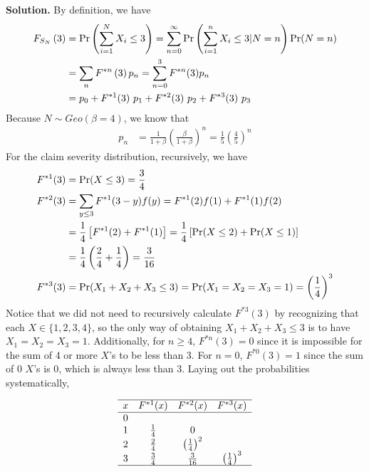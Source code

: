 \documentclass[]{book}
\theoremstyle{definition}
\theoremstyle{definition}
\theoremstyle{definition}
\theoremstyle{remark}
\begin{document}
\hypertarget{toggleExampleAggLoss.3.3}{}
\textbf{Solution.} By definition, we have \[\begin{aligned}
F_{S_N}\left(3 \right) &= {\rm Pr}\left(\sum_{i=1}^N X_i \leq 3\right) = \sum_{n=0}^\infty {\rm Pr}\left(\sum_{i=1}^n X_i\leq 3|N=n\right){\rm Pr}(N=n) \\
&= \sum_n F^{\ast n} \left(3 \right) p_n = \sum_{n=0}^3 F^{\ast n}(3) p_n \\
&= p_0 + F^{\ast 1}(3) \ p_1 + F^{\ast 2}(3) \ p_2 + F^{\ast 3}(3) \ p_3
\end{aligned}\] Because \(N \sim Geo(\beta=4)\), we know that
\[\begin{aligned}
p_n &= \frac{1}{1+\beta}
\left(\frac{\beta}{1+ \beta} \right)^n = \frac{1}{5} \left(\frac{4}{5} \right)^n
\end{aligned}\] For the claim severity distribution, recursively, we
have \[\begin{aligned}
F^{\ast 1}(3) &= \Pr(X \le 3) = \frac{3}{4} \\
F^{\ast 2}(3) &= \sum_{y \le 3} F^{\ast 1} (3-y) f(y) = F^{\ast 1}(2)f(1) + F^{\ast 1}(1)f(2) \\
&= \frac{1}{4}\left[F^{\ast 1} (2) + F^{\ast 1}(1)\right] = \frac{1}{4}\left[{\rm Pr}(X\leq 2) + {\rm Pr}(X \leq 1) \right] \\
&= \frac{1}{4} \left(\frac{2}{4} + \frac{1}{4} \right) = \frac{3}{16}\\
F^{\ast 3}(3) &= \Pr(X_1+X_2 + X_3 \le 3) = \Pr(X_1=X_2=X_3=1) = \left(\frac{1}{4} \right)^3
\end{aligned}\] Notice that we did not need to recursively calculate
\(F^{\ast 3}(3)\) by recognizing that each \(X \in \{1,2,3,4\}\), so the
only way of obtaining \(X_1+X_2+X_3 \leq 3\) is to have
\(X_1=X_2=X_3=1\). Additionally, for \(n \geq 4\), \(F^{\ast n} (3)=0\)
since it is impossible for the sum of 4 or more \(X\)'s to be less than
3. For \(n=0\), \(F^{\ast 0}(3) = 1\) since the sum of 0 \(X\)'s is 0,
which is always less than 3. Laying out the probabilities
systematically,

\[\begin {matrix}
\begin{array}{c c c c}\hline
    x & F^{\ast 1}(x) & F^{\ast 2}(x) & F^{\ast 3}(x)\\ \hline
    0 & & & \\
    1 & \frac{1}{4} & 0 & \\
    2 & \frac{2}{4} & \left( \frac{1}{4} \right)^2 & \\
    3 & \frac{3}{4} & \frac{3}{16} & \left( \frac{1}{4} \right)^3 \\ \hline
\end{array}
\end{matrix}\]
\end{document}
